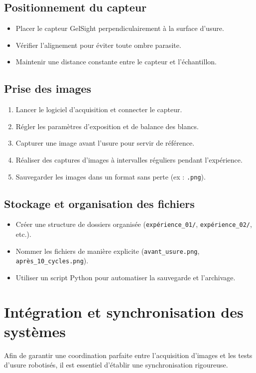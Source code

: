 \documentclass[a4paper,12pt]{article}
\begin{document}
\subsection{Positionnement du capteur}
\begin{itemize}
    \item Placer le capteur GelSight perpendiculairement à la surface d'usure.
    \item Vérifier l’alignement pour éviter toute ombre parasite.
    \item Maintenir une distance constante entre le capteur et l’échantillon.
\end{itemize}

\subsection{Prise des images}
\begin{enumerate}
    \item Lancer le logiciel d’acquisition et connecter le capteur.
    \item Régler les paramètres d’exposition et de balance des blancs.
    \item Capturer une image avant l’usure pour servir de référence.
    \item Réaliser des captures d’images à intervalles réguliers pendant l'expérience.
    \item Sauvegarder les images dans un format sans perte (ex : \texttt{.png}).
\end{enumerate}

\subsection{Stockage et organisation des fichiers}
\begin{itemize}
    \item Créer une structure de dossiers organisée (\texttt{expérience\_01/}, \texttt{expérience\_02/}, etc.).
    \item Nommer les fichiers de manière explicite (\texttt{avant\_usure.png}, \texttt{après\_10\_cycles.png}).
    \item Utiliser un script Python pour automatiser la sauvegarde et l’archivage.
\end{itemize}

\section{Intégration et synchronisation des systèmes}
Afin de garantir une coordination parfaite entre l'acquisition d'images et les tests d'usure robotisés, il est essentiel d'établir une synchronisation rigoureuse.
\end{document}

